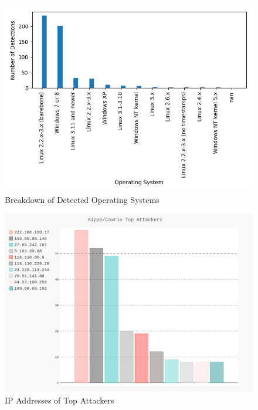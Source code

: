 \documentclass[a0,landscape]{a0poster}
\begin{document}
\begin{multicols}{3}
\begin{figure}[H]
	\begin{center}
		\includegraphics[width=25cm]{top_os.png}
		\caption{Breakdown of Detected Operating Systems}
	\end{center}
\end{figure} 

\begin{figure}[H]
	\begin{center}
		\includegraphics[width=20cm]{images/top_attackers.png}
		\caption{IP Addresses of Top Attackers}
	\end{center}
\end{figure} 


\end{multicols}
\end{document}
